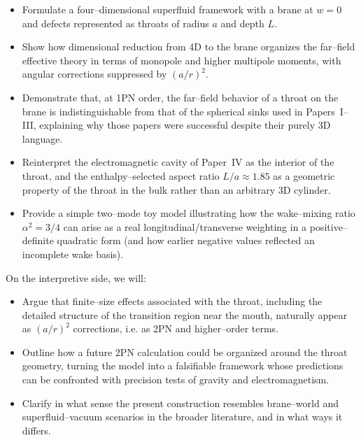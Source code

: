 \documentclass[12pt]{article}
\begin{document}
\begin{itemize}
  \item Formulate a four–dimensional superfluid framework with a brane at
  $w=0$ and defects represented as throats of radius $a$ and depth $L$.

  \item Show how dimensional reduction from 4D to the brane organizes the
  far–field effective theory in terms of monopole and higher multipole
  moments, with angular corrections suppressed by $(a/r)^2$.

  \item Demonstrate that, at 1PN order, the far–field behavior of a throat
  on the brane is indistinguishable from that of the spherical sinks used in
  Papers~I--III, explaining why those papers were successful despite their
  purely 3D language.

  \item Reinterpret the electromagnetic cavity of Paper~IV as the interior
  of the throat, and the enthalpy–selected aspect ratio $L/a \approx 1.85$
  as a geometric property of the throat in the bulk rather than an arbitrary
  3D cylinder.

  \item Provide a simple two--mode toy model illustrating how the wake--mixing
  ratio $\alpha^2 = 3/4$ can arise as a real longitudinal/transverse
  weighting in a positive--definite quadratic form (and how earlier negative
  values reflected an incomplete wake basis).
\end{itemize}

On the interpretive side, we will:

\begin{itemize}
  \item Argue that finite–size effects associated with the throat, including
  the detailed structure of the transition region near the mouth, naturally
  appear as $(a/r)^2$ corrections, i.e. as 2PN and higher–order terms.

  \item Outline how a future 2PN calculation could be organized around the
  throat geometry, turning the model into a falsifiable framework whose
  predictions can be confronted with precision tests of gravity and
  electromagnetism.

  \item Clarify in what sense the present construction resembles brane–world
  and superfluid–vacuum scenarios in the broader literature, and in what
  ways it differs.
\end{itemize}
\end{document}
